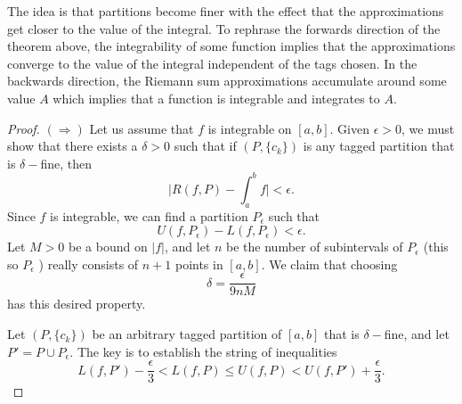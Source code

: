 The idea is that partitions become finer with the effect that the approximations get closer to the value of the integral. To rephrase the forwards direction of the theorem above, the integrability of some function implies that the approximations converge to the value of the integral independent of the tags chosen. In the backwards direction, the Riemann sum approximations accumulate around some value \( A  \) which implies that a function is integrable and integrates to \( A  \). 

\begin{proof}
    \( (\Rightarrow)  \) Let us assume that \( f  \) is integrable on \( [a,b]  \). Given \( \epsilon > 0  \), we must show that there exists a \( \delta > 0  \) such that if \( ( P, \{ c_{k } \} ) \) is any tagged partition that is \( \delta- \)fine, then 
    \[  \Big| R(f,P) - \int_{ a }^{ b } f  \Big| < \epsilon. \]
    Since \( f  \) is integrable, we can find a partition \( P_{\epsilon } \) such that 
    \[  U(f, P_{\epsilon }) - L(f, P_{\epsilon })  < \epsilon. \] Let \( M > 0  \) be a bound on \( | f |  \), and let \( n  \) be the number of subintervals of \( P_{\epsilon } \) (this so \( P_{\epsilon }\) ) really consists of \( n + 1  \) points in \( [a,b]  \). We claim that choosing 
    \[  \delta = \frac{ \epsilon  }{ 9nM }  \] has this desired property. 

    Let \( (P, \{ c_{k}    \} ) \) be an arbitrary tagged partition of \( [a,b]  \) that is \( \delta- \)fine, and let \( P' = P \cup P_{\epsilon } \). The key is to establish the string of inequalities 
    \[  L(f,P') - \frac{ \epsilon  }{ 3 }  < L(f,P ) \leq U(f,P) < U(f,P') + \frac{ \epsilon  }{ 3 }.\]
\end{proof}


